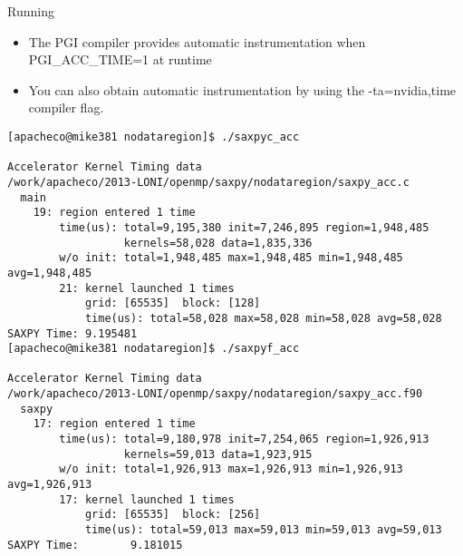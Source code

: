\documentclass[c,mathserif,compress,xcolor=svgnames]{beamer}
\newenvironment{bblock}[0]
{
\begin{beamerboxesrounded}[upper=uppercol1,lower=lowercol1,shadow=true]}
{\end{beamerboxesrounded}}
\begin{document}
\begin{frame}[fragile]{\small Running}
  \begin{itemize}
    \item The PGI compiler provides automatic instrumentation when {\color{orange}PGI\_ACC\_TIME=1} at runtime
    \item You can also obtain automatic instrumentation by using the {\color{orange}-ta=nvidia,time} compiler flag.
  \end{itemize}
  \begin{bblock}{}
    {\fontsize{5}{6}\selectfont
      \begin{Verbatim}
[apacheco@mike381 nodataregion]$ ./saxpyc_acc 

Accelerator Kernel Timing data
/work/apacheco/2013-LONI/openmp/saxpy/nodataregion/saxpy_acc.c
  main
    19: region entered 1 time
        time(us): total=9,195,380 init=7,246,895 region=1,948,485
                  kernels=58,028 data=1,835,336
        w/o init: total=1,948,485 max=1,948,485 min=1,948,485 avg=1,948,485
        21: kernel launched 1 times
            grid: [65535]  block: [128]
            time(us): total=58,028 max=58,028 min=58,028 avg=58,028
SAXPY Time: 9.195481
[apacheco@mike381 nodataregion]$ ./saxpyf_acc 

Accelerator Kernel Timing data
/work/apacheco/2013-LONI/openmp/saxpy/nodataregion/saxpy_acc.f90
  saxpy
    17: region entered 1 time
        time(us): total=9,180,978 init=7,254,065 region=1,926,913
                  kernels=59,013 data=1,923,915
        w/o init: total=1,926,913 max=1,926,913 min=1,926,913 avg=1,926,913
        17: kernel launched 1 times
            grid: [65535]  block: [256]
            time(us): total=59,013 max=59,013 min=59,013 avg=59,013
SAXPY Time:        9.181015
      \end{Verbatim}
    }
  \end{bblock}
\end{frame}
\end{document}
